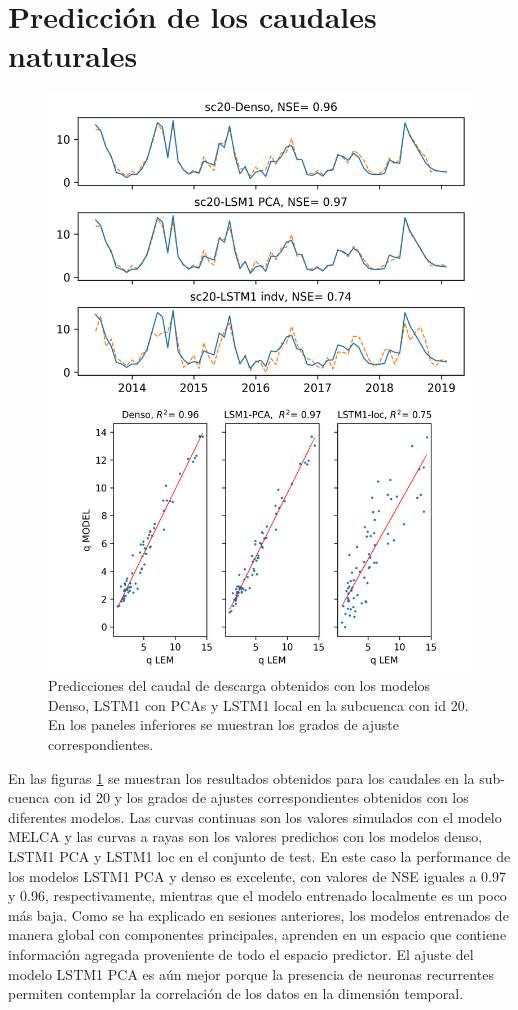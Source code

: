 \section{Predicción de los caudales naturales}


\begin{figure}[h!]
  \begin{center}
    \includegraphics[height=6.in]{Figures/comp_grilla/resultados_sc20}
    \caption{ Predicciones del caudal de descarga obtenidos con los modelos Denso, LSTM1 con PCAs y LSTM1 local en la subcuenca 
    con id 20. En los
    paneles inferiores se muestran los grados de ajuste correspondientes.}
    \label{alcomp20}
  \end{center}
\end{figure}



En las figuras \ref{alcomp20} se muestran  los resultados obtenidos para los caudales en la sub-cuenca con id 20
y los grados de ajustes correspondientes obtenidos con los diferentes modelos.
Las curvas continuas son los valores simulados con el modelo MELCA y las curvas a rayas son los valores predichos 
con los modelos denso, LSTM1 PCA y LSTM1 loc en el conjunto de test. En este caso la performance de los modelos
LSTM1 PCA y denso es excelente, con valores de NSE iguales a 0.97 y 0.96, respectivamente, 
mientras que el modelo entrenado localmente es un poco más baja. Como se ha explicado en sesiones anteriores, los
modelos entrenados de manera global con componentes principales, aprenden en un espacio que contiene información agregada
proveniente de todo el espacio predictor. El ajuste del modelo LSTM1 PCA es aún mejor porque la presencia de neuronas recurrentes 
permiten contemplar la correlación de los datos en la dimensión temporal.




